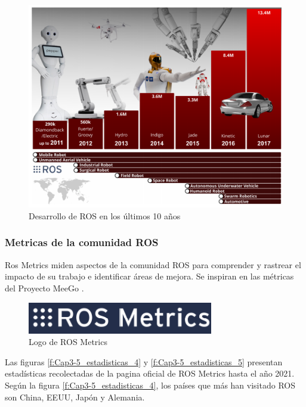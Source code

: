             \begin{figure}[htb]
                \centering
                \includegraphics[width=1.0\linewidth]{Main/Chapter3/Images3/science_robot_esta_2.png}
                \caption{Desarrollo de ROS en los últimos 10 años \cite{Zhangeaar1868}}
                \label{f:Cap3-5_estadisticas_2}
            \end{figure}  


         \newpage
    
        \subsubsection{Metricas de la comunidad ROS}
    
    Ros Metrics miden aspectos de la comunidad ROS para comprender y rastrear el impacto de su trabajo e identificar áreas de mejora. Se inspiran en las métricas del Proyecto MeeGo .
    
        \begin{figure}[htb]
            \centering
            \includegraphics[width=0.4\linewidth]{Main/Chapter3/Images3/cap3_estadisticas_3.png}
            \caption{Logo de ROS Metrics \cite{rosmetrics}}
            \label{f:Cap3-5_estadisticas_3}
        \end{figure}  
        
        Las figuras \eqref{f:Cap3-5_estadisticas_4} y \eqref{f:Cap3-5_estadisticas_5} presentan estadísticas recolectadas de la pagina oficial de ROS Metrics hasta el año 2021. Según la figura \eqref{f:Cap3-5_estadisticas_4}, los países que más han visitado ROS son China, EEUU, Japón y Alemania. 
        
